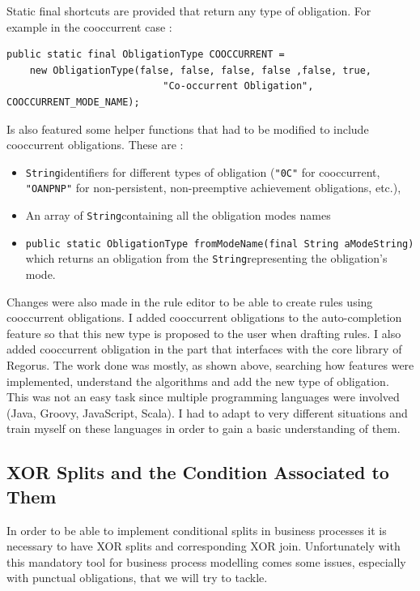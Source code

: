 \documentclass[10pt]{report}
\providecommand{\inlinecode}[1]{\lstinline$#1$} %
\newcommand{\String}{\inlinecode{String}}
\begin{document}
Static final shortcuts are provided that return any type of obligation. For example in the cooccurrent case : 
\begin{lstlisting}
public static final ObligationType COOCCURRENT = 
	new ObligationType(false, false, false, false ,false, true, 
                           "Co-occurrent Obligation", COOCCURRENT_MODE_NAME);
\end{lstlisting}

Is also featured some helper functions that had to be modified to include cooccurrent obligations. These are : 
\begin{itemize}
\item \String identifiers for different types of obligation (\inlinecode{"0C"} for cooccurrent, \inlinecode{"OANPNP"} for non-persistent, non-preemptive achievement obligations, etc.),
\item An array of \String containing all the obligation modes names
\item \inlinecode{public static ObligationType fromModeName(final String aModeString)} which returns an obligation from the \String representing the obligation's mode.  
\end{itemize}

Changes were also made in the rule editor to be able to create rules using cooccurrent obligations. I added cooccurrent obligations to the auto-completion feature so that this new type is proposed to the user when drafting rules. I also added cooccurrent obligation in the part that interfaces with the core library of Regorus. The work done was mostly, as shown above, searching how features were implemented, understand the algorithms and add the new type of obligation. This was not an easy task since multiple programming languages were involved (Java, Groovy, JavaScript, Scala). I had to adapt to very different situations and train myself on these languages in order to gain a basic understanding of them.



\subsection{XOR Splits and the Condition Associated to Them}
In order to be able to implement conditional splits in business processes it is necessary to have XOR splits and corresponding XOR join. Unfortunately with this mandatory tool for business process modelling comes some issues, especially with punctual obligations, that we will try to tackle.
\end{document}
